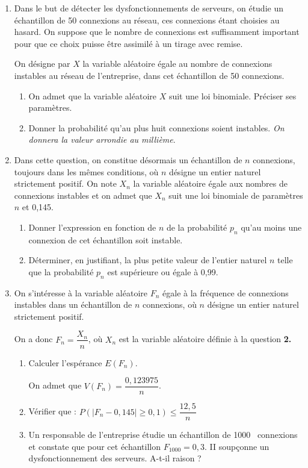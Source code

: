 \documentclass[10pt]{article}
\providecommand{\np}[2][]{{#2~#1}}
\begin{document}
\begin{enumerate}
\item Dans le but de détecter les dysfonctionnements de serveurs, on étudie un échantillon de 50 connexions au réseau, ces connexions étant choisies au hasard. On suppose que le nombre de connexions est suffisamment important pour que ce choix puisse être assimilé à un tirage avec remise.

\smallskip

On désigne par $X$ la variable aléatoire égale au nombre de connexions instables au réseau de l'entreprise, dans cet échantillon de 50 connexions.

	\begin{enumerate}
		\item On admet que la variable aléatoire $X$ suit une loi binomiale. Préciser ses paramètres.
		\item Donner la probabilité qu'au plus huit connexions soient instables. \emph{On donnera la valeur arrondie au millième}.
	\end{enumerate}

\item Dans cette question, on constitue désormais un échantillon de $n$ connexions, toujours dans les mêmes conditions, où $n$ désigne un entier naturel strictement positif. On note $X_{n}$ la variable aléatoire égale aux nombres de connexions instables et on admet que $X_{n}$ suit une loi binomiale de paramètres $n$ et 0,145.
	\begin{enumerate}
		\item Donner l'expression en fonction de $n$ de la probabilité $p_{n}$ qu'au moins une connexion de cet échantillon soit instable.
		\item Déterminer, en justifiant, la plus petite valeur de l'entier naturel $n$ telle que la probabilité $p_{n}$ est supérieure ou égale à 0,99.
	\end{enumerate}
\item On s'intéresse à la variable aléatoire $F_{n}$ égale à la fréquence de connexions instables dans un échantillon de $n$ connexions, où $n$ désigne un entier naturel strictement positif.

On a donc $F_{n}=\dfrac{X_{n}}{n}$, où $X_{n}$ est la variable aléatoire définie à la question \textbf{2.}
	\begin{enumerate}
		\item Calculer l'espérance $E\left(F_{n}\right)$.

On admet que $V\left(F_{n}\right)=\dfrac{0,123975}{n}$.

		\item Vérifier que : $P\left(\left|F_{n}-0,145\right| \geqslant 0,1\right) \leqslant \dfrac{12,5}{n}$
		\item Un responsable de l'entreprise étudie un échantillon de \np{1000} connexions et constate que pour cet échantillon $F_{1000}=0,3$. II soupçonne un dysfonctionnement des serveurs. A-t-il raison ?
	\end{enumerate}
\end{enumerate}
\end{document}
